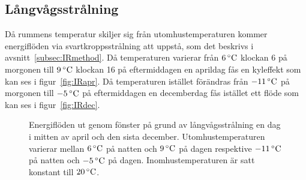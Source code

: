 \subsection{Långvågsstrålning}

Då rummens temperatur skiljer sig från utomhustemperaturen kommer energiflöden via svartkroppsstrålning att uppstå, som det beskrivs i avsnitt~\ref{subsec:IRmethod}. Då temperaturen varierar från $\unit[6]{^{\circ}C}$ klockan 6 på morgonen till $\unit[9]{^{\circ}C}$ klockan 16 på eftermiddagen en aprildag fås en kyleffekt som kan ses i figur~\ref{fig:IRapr}. Då temperaturen istället förändras från $\unit[-11]{^{\circ}C}$ på morgonen till $\unit[-5]{^{\circ}C}$ på eftermiddagen en decemberdag fås istället ett flöde som kan ses i figur~\ref{fig:IRdec}.

\begin{figure}[hpbt]
\centering

\vspace{1cm}

\caption{\label{fig:IRwindows} Energiflöden ut genom fönster på grund av långvågsstrålning en dag i mitten av april och den sista december.
Utomhustemperaturen varierar mellan $\unit[6]{^\circ C}$ på natten och $\unit[9]{^\circ C}$ på dagen respektive $\unit[-11]{^\circ C}$ på natten och $\unit[-5]{^\circ C}$ på dagen. Inomhustemperaturen är satt konstant till $\unit[20]{^\circ C}$.}
\end{figure}


